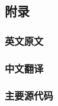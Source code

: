 \documentclass[a4paper,12pt]{report}
\begin{document}
\graphicspath{{figures/}}

\begin{CJK}{UTF8}{song}








\tableofcontents
\newpage










\chapter{附录}
\subsection{英文原文}
\subsection{中文翻译}
\subsection{主要源代码}

\end{CJK}
\end{document}
